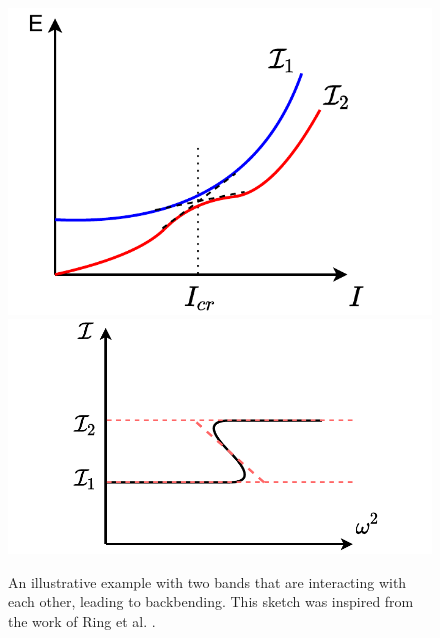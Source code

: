 \begin{figure}
    \centering
    \includegraphics[scale=0.56]{Chapters/Figures/backbending_crossing_1.pdf}
    \includegraphics[scale=0.56]{Chapters/Figures/backbending_crossing_2.pdf}
    \caption{An illustrative example with two bands that are interacting with each other, leading to backbending. This sketch was inspired from the work of Ring et al. \cite{ring2004nuclear}.}
    \label{bands-crossing-backbending}
\end{figure}

